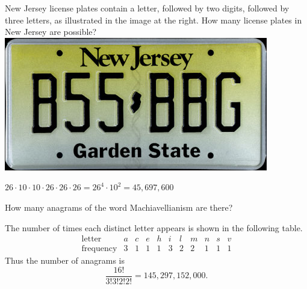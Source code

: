 \documentclass[addpoints,12pt]{exam}
\begin{document}
\begin{questions}

\begin{multicols}{2}
\question
New Jersey license plates contain a letter,
followed by two digits, followed by three letters,
as illustrated in the image at the right.
How many license plates in New Jersey are possible?\\
\columnbreak
\includegraphics[scale=.3]{NewJersy}
\end{multicols}
\begin{solution}
$26\cdot 10\cdot 10\cdot 26\cdot 26\cdot 26=26^4\cdot 10^2
=45,697,600$
\end{solution}

\question How many anagrams of the word
{\textsf{Machiavellianism}} are there?
\begin{solution}
The number of times each distinct letter appears is
shown in the following table.
\[\begin{array}{r|cccccccccc}
\text{letter}&a&c&e&h&i&l&m&n&s&v\\\hline
\text{frequency}&3&1&1&1&3&2&2&1&1&1
\end{array}\]
Thus the number of anagrams is
\[\frac{16!}{3!3!2!2!}=145,297,152,000.\]
\end{solution}


\end{questions}
\end{document}

